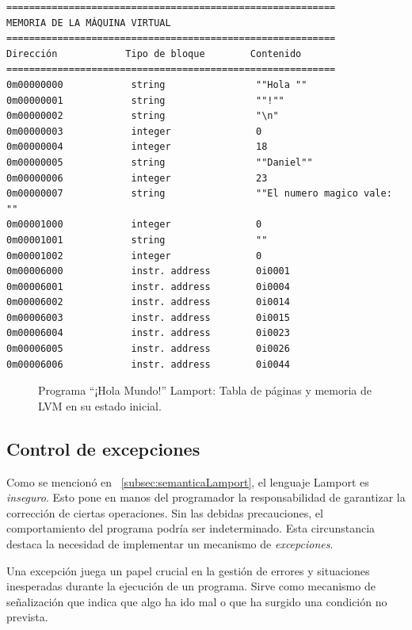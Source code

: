 \begin{verbatim}
==========================================================
MEMORIA DE LA MÁQUINA VIRTUAL
==========================================================
Dirección            Tipo de bloque        Contenido             
==========================================================
0m00000000            string                ""Hola ""             
0m00000001            string                ""!""                 
0m00000002            string                "\n"                  
0m00000003            integer               0                     
0m00000004            integer               18                    
0m00000005            string                ""Daniel""            
0m00000006            integer               23                    
0m00000007            string                ""El numero magico vale: ""
0m00001000            integer               0                     
0m00001001            string                ""                    
0m00001002            integer               0                     
0m00006000            instr. address        0i0001                
0m00006001            instr. address        0i0004                
0m00006002            instr. address        0i0014                
0m00006003            instr. address        0i0015                
0m00006004            instr. address        0i0023                
0m00006005            instr. address        0i0026                
0m00006006            instr. address        0i0044  
\end{verbatim}
\begin{figure}[hbtp]
\caption{Programa ``¡Hola Mundo!'' Lamport: Tabla de páginas y memoria de LVM en su estado inicial.}
\label{fig:preLVMHolaMundo}
\end{figure}

\subsection{Control de excepciones}
Como se mencionó en ~\ref{subsec:semanticaLamport}, el lenguaje Lamport es \textit{inseguro}. Esto pone en manos del programador la responsabilidad de garantizar la corrección de ciertas operaciones. Sin las debidas precauciones, el comportamiento del programa podría ser indeterminado. Esta circunstancia destaca la necesidad de implementar un mecanismo de \textit{excepciones}.

\vspace{0.5cm}
Una excepción juega un papel crucial en la gestión de errores y situaciones inesperadas durante la ejecución de un programa. Sirve como mecanismo de señalización que indica que algo ha ido mal o que ha surgido una condición no prevista.

